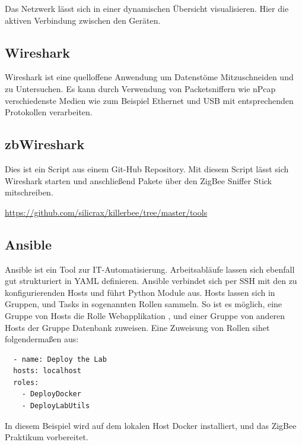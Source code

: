 Das Netzwerk lässt sich in einer dynamischen Übersicht visualisieren. Hier die aktiven Verbindung zwischen den Geräten. 

\subsection{Wireshark}

Wireshark ist eine quelloffene Anwendung um Datenstöme Mitzuschneiden und zu Untersuchen. Es kann durch Verwendung
von Packetsniffern wie nPcap verschiedenste Medien wie zum Beispiel Ethernet und USB mit entsprechenden Protokollen
verarbeiten.

\subsection{zbWireshark}

Dies ist ein Script aus einem Git-Hub Repository. Mit diesem Script lässt sich Wireshark starten und anschließend Pakete über den 
ZigBee Sniffer Stick mitschreiben.

\url{https://github.com/silicrax/killerbee/tree/master/tools}

\subsection{Ansible}

Ansible ist ein Tool zur IT-Automatisierung. Arbeitsabläufe lassen sich ebenfall gut strukturiert in YAML definieren. Ansible verbindet sich per SSH 
mit den zu konfigurierenden Hosts und führt Python Module aus. Hosts lassen sich in Gruppen, und Tasks in sogenannten Rollen sammeln. So ist es möglich,
eine Gruppe von Hosts die Rolle \grqq Webapplikation \grqq{}, und einer Gruppe von anderen Hosts der Gruppe \grqq Datenbank \grqq{} zuweisen. 
Eine Zuweisung von Rollen sihet folgendermaßen aus:
\begin{lstlisting}
  - name: Deploy the Lab
  hosts: localhost
  roles:
    - DeployDocker
    - DeployLabUtils
\end{lstlisting}

In diesem Beispiel wird auf dem lokalen Host Docker installiert, und das ZigBee Praktikum vorbereitet.

\subsection{}
